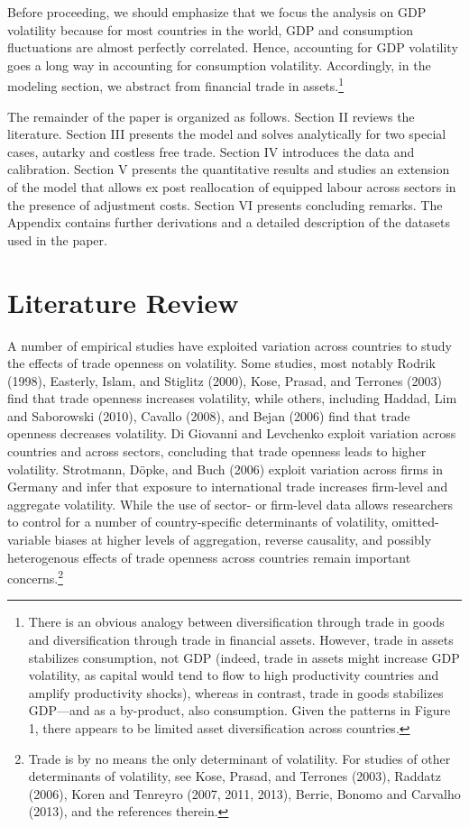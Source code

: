 \documentclass[12pt]{article}
\begin{document}
Before proceeding, we should emphasize that we focus the analysis on GDP
volatility because for most countries in the world, GDP and consumption
fluctuations are almost perfectly correlated. Hence, accounting for GDP
volatility goes a long way in accounting for consumption volatility.
Accordingly, in the modeling section, we abstract from financial trade in
assets.\footnote{%
There is an obvious analogy between diversification through trade in goods
and diversification through trade in financial assets. However, trade in
assets stabilizes consumption, not GDP (indeed, trade in assets might
increase GDP volatility, as capital would tend to flow to high productivity
countries and amplify productivity shocks), whereas in contrast, trade in
goods stabilizes GDP---and as a by-product, also consumption. Given the
patterns in Figure 1, there appears to be limited asset diversification
across countries.}

The remainder of the paper is organized as follows. Section II reviews the
literature. Section III presents the model and solves analytically for two
special cases, autarky and costless free trade. Section IV introduces the
data and calibration. Section V presents the quantitative results and
studies an extension of the model that allows ex post reallocation of
equipped labour across sectors in the presence of adjustment costs. Section
VI presents concluding remarks. The Appendix contains further derivations
and a detailed description of the datasets used in the paper.

\section{Literature Review}

A number of empirical studies have exploited variation across countries to
study the effects of trade openness on volatility. Some studies, most
notably Rodrik (1998), Easterly, Islam, and Stiglitz (2000), Kose, Prasad,
and Terrones (2003) find that trade openness increases volatility, while
others, including Haddad, Lim and Saborowski (2010), Cavallo (2008), and
Bejan (2006) find that trade openness decreases volatility. Di Giovanni and
Levchenko exploit variation across countries and across sectors, concluding
that trade openness leads to higher volatility. Strotmann, D\"{o}pke, and
Buch (2006) exploit variation across firms in Germany and infer that
exposure to international trade increases firm-level and aggregate
volatility. While the use of sector- or firm-level data allows researchers
to control for a number of country-specific determinants of volatility,
omitted-variable biases at higher levels of aggregation, reverse causality,
and possibly heterogenous effects of trade openness across countries remain
important concerns.\footnote{%
Trade is by no means the only determinant of volatility. For studies of
other determinants of volatility, see Kose, Prasad, and Terrones (2003),
Raddatz (2006), Koren and Tenreyro (2007, 2011, 2013), Berrie, Bonomo and
Carvalho (2013), and the references therein.}
\end{document}
